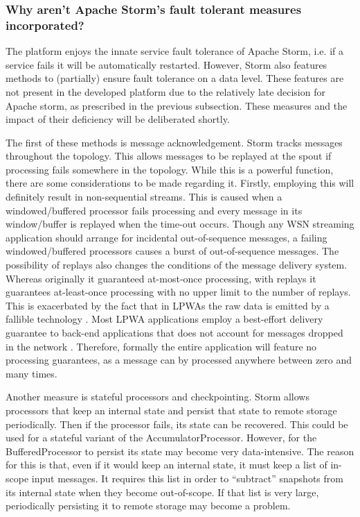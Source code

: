 \subsubsection{Why aren't Apache Storm's fault tolerant measures incorporated?}
The platform enjoys the innate service fault tolerance of Apache Storm, i.e. if a service fails it will be automatically restarted. However, Storm also features methods to (partially) ensure fault tolerance on a data level. These features are not present in the developed platform due to the relatively late decision for Apache storm, as prescribed in the previous subsection. These measures and the impact of their deficiency will be deliberated shortly.

The first of these methods is message acknowledgement. Storm tracks messages throughout the topology. This allows messages to be replayed at the spout if processing fails somewhere in the topology. While this is a powerful function, there are some considerations to be made regarding it. Firstly, employing this will definitely result in non-sequential streams. This is caused when a windowed/buffered processor fails processing and every message in its window/buffer is replayed when the time-out occurs. Though any WSN streaming application should arrange for incidental out-of-sequence messages, a failing windowed/buffered processors causes a burst of out-of-sequence messages. The possibility of replays also changes the conditions of the message delivery system. Whereas originally it guaranteed at-most-once processing, with replays it guarantees at-least-once processing with no upper limit to the number of replays. This is exacerbated by the fact that in LPWAs the raw data is emitted by a fallible technology \cite{ontology}. Most LPWA applications employ a best-effort delivery guarantee to back-end applications that does not account for messages dropped in the network \cite{stream_requirements}. Therefore, formally the entire application will feature no processing guarantees, as a message can by processed anywhere between zero and many times.

Another measure is stateful processors and checkpointing. Storm allows processors that keep an internal state and persist that state to remote storage periodically. Then if the processor fails, its state can be recovered. This could be used for a stateful variant of the AccumulatorProcessor. However, for the BufferedProcessor to persist its state may become very data-intensive. The reason for this is that, even if it would keep an internal state, it must keep a list of in-scope input messages. It requires this list in order to ``subtract'' snapshots from its internal state when they become out-of-scope. If that list is very large, periodically persisting it to remote storage may become a problem.

